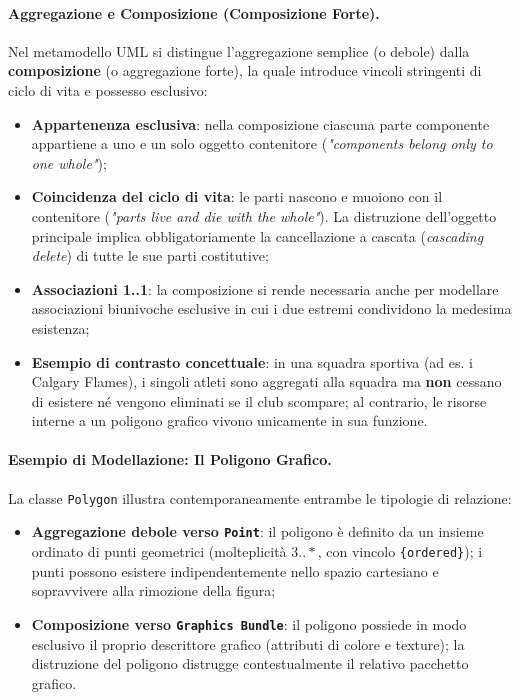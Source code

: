 \documentclass[12pt]{extarticle}
\begin{document}
\paragraph{Aggregazione e Composizione (Composizione Forte).}
Nel metamodello UML si distingue l'aggregazione semplice (o debole) dalla \textbf{composizione} (o aggregazione forte), la quale introduce vincoli stringenti di ciclo di vita e possesso esclusivo:
\begin{itemize}
    \item \textbf{Appartenenza esclusiva}: nella composizione ciascuna parte componente appartiene a uno e un solo oggetto contenitore (\textit{"components belong only to one whole"});
    \item \textbf{Coincidenza del ciclo di vita}: le parti nascono e muoiono con il contenitore (\textit{"parts live and die with the whole"}). La distruzione dell'oggetto principale implica obbligatoriamente la cancellazione a cascata (\textit{cascading delete}) di tutte le sue parti costitutive;
    \item \textbf{Associazioni 1..1}: la composizione si rende necessaria anche per modellare associazioni biunivoche esclusive in cui i due estremi condividono la medesima esistenza;
    \item \textbf{Esempio di contrasto concettuale}: in una squadra sportiva (ad es. i Calgary Flames), i singoli atleti sono aggregati alla squadra ma \textbf{non} cessano di esistere né vengono eliminati se il club scompare; al contrario, le risorse interne a un poligono grafico vivono unicamente in sua funzione.
\end{itemize}

\paragraph{Esempio di Modellazione: Il Poligono Grafico.}
La classe \texttt{Polygon} illustra contemporaneamente entrambe le tipologie di relazione:
\begin{itemize}
    \item \textbf{Aggregazione debole verso \texttt{Point}}: il poligono è definito da un insieme ordinato di punti geometrici (molteplicità $3..*$, con vincolo \texttt{\{ordered\}}); i punti possono esistere indipendentemente nello spazio cartesiano e sopravvivere alla rimozione della figura;
    \item \textbf{Composizione verso \texttt{Graphics Bundle}}: il poligono possiede in modo esclusivo il proprio descrittore grafico (attributi di colore e texture); la distruzione del poligono distrugge contestualmente il relativo pacchetto grafico.
\end{itemize}
\end{document}
